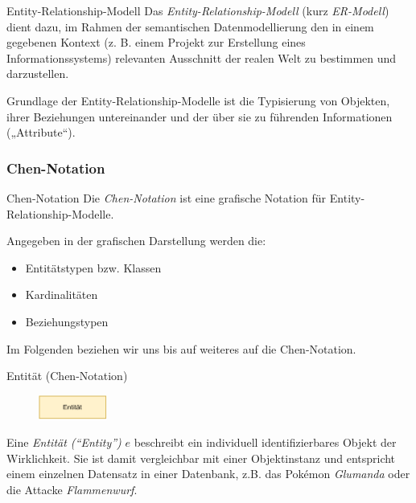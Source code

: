 \begin{defi}{Entity-Relationship-Modell}
    Das \emph{Entity-Relationship-Modell} (kurz \emph{ER-Modell}) dient dazu, im Rahmen der semantischen Datenmodellierung den in einem gegebenen Kontext (z. B. einem Projekt zur Erstellung eines Informationssystems) relevanten Ausschnitt der realen Welt zu bestimmen und darzustellen.

    Grundlage der Entity-Relationship-Modelle ist die Typisierung von Objekten, ihrer Beziehungen untereinander und der über sie zu führenden Informationen („Attribute“).
\end{defi}

\subsubsection{Chen-Notation}

\begin{defi}{Chen-Notation}
    Die \emph{Chen-Notation} ist eine grafische Notation für Entity-Relationship-Modelle.

    Angegeben in der grafischen Darstellung werden die:
    \begin{itemize}
        \item Entitätstypen bzw. Klassen
        \item Kardinalitäten
        \item Beziehungstypen
    \end{itemize}

    Im Folgenden beziehen wir uns bis auf weiteres auf die Chen-Notation.
\end{defi}

\begin{defi}{Entität (Chen-Notation)}
    \begin{figure}
        \begin{center}
            \includegraphics[width=0.2\textwidth]{includes/figures/definition_entity_relationship_model_entity.pdf}
        \end{center}
    \end{figure}
    Eine \emph{Entität (\enquote{Entity})} $e$ beschreibt ein individuell identifizierbares Objekt der Wirklichkeit.
    Sie ist damit vergleichbar mit einer Objektinstanz und entspricht einem einzelnen Datensatz in einer Datenbank, z.B. das Pokémon \emph{Glumanda} oder die Attacke \emph{Flammenwurf}.
\end{defi}

